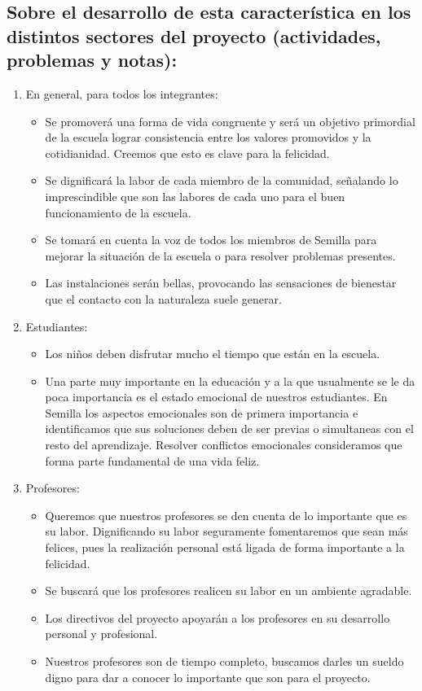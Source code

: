 \documentclass[10pt,letterpaper,oneside]{book}
\begin{document}
		\subsection*{Sobre el desarrollo de esta característica en los distintos sectores del proyecto (actividades, problemas y notas):}
			\begin{enumerate}[label=\Alph*]
			\item En general, para todos los integrantes:
			\begin{itemize}
			\item Se promoverá una forma de vida congruente y será un objetivo primordial de la escuela lograr consistencia entre los valores promovidos y la cotidianidad. Creemos que esto es clave para la felicidad.
			\item Se dignificará la labor de cada miembro de la comunidad, señalando lo imprescindible que son las labores de cada uno para el buen funcionamiento de la escuela.
			\item Se tomará en cuenta la voz de todos los miembros de Semilla para mejorar la situación de la escuela o para resolver problemas presentes.
			\item Las instalaciones serán bellas, provocando las sensaciones de bienestar que el contacto con la naturaleza suele generar.
			\end{itemize}
			\item Estudiantes: 
			\begin{itemize}
			\item Los niños deben disfrutar mucho el tiempo que están en la escuela.
			\item Una parte muy importante en la educación y a la que usualmente se le da poca importancia es el estado emocional de nuestros estudiantes. En Semilla los aspectos emocionales son de primera importancia e identificamos que sus soluciones deben de ser previas o simultaneas con el resto del aprendizaje. Resolver conflictos emocionales consideramos que forma parte fundamental de una vida feliz.

\end{itemize}			

			\item Profesores:
			\begin{itemize}
			 \item Queremos que nuestros profesores se den cuenta de lo importante que es su labor. Dignificando su labor seguramente fomentaremos que sean más felices, pues la realización personal está ligada de forma importante a la felicidad.
			 \item Se buscará que los profesores realicen su labor en un ambiente agradable.
			 \item Los directivos del proyecto apoyarán a los profesores en su desarrollo personal y profesional.
			 \item Nuestros profesores son de tiempo completo, buscamos darles un sueldo digno para dar a conocer lo importante que son para el proyecto.
\end{itemize}


\end{enumerate}
\end{document}
